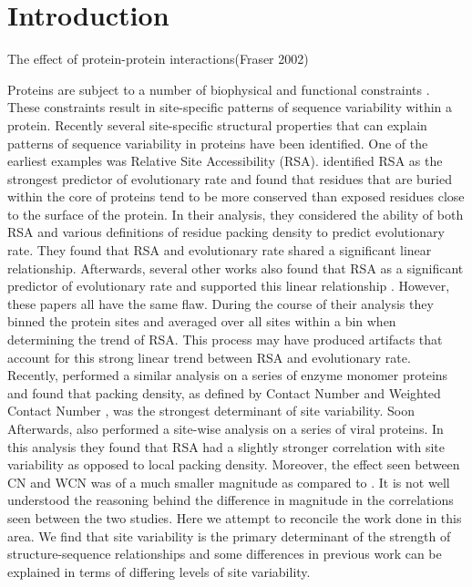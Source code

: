 \documentclass[12pt]{article}
\begin{document}
\section{Introduction}
\label{sec:intro}

The effect of protein-protein interactions(Fraser 2002)

Proteins are subject to a number of biophysical and functional constraints \citep{Scherreretal2012, Wilkeetal2010, Sikoseketal2014, Liberlesetal2009, Huangetal2014, Fraseretal2002, Liaoetal2010, Serohijosetal2012}. These constraints result in site-specific patterns of sequence variability within a protein. Recently several site-specific structural properties that can explain patterns of sequence variability in proteins have been identified. One of the earliest examples was Relative Site Accessibility (RSA). \cite{Fransozaetal2009} identified RSA as the strongest predictor of evolutionary rate and found that residues that are buried within the core of proteins tend to be more conserved than exposed residues close to the surface of the protein. In their analysis, they considered the ability of both RSA and various definitions of residue packing density to predict evolutionary rate. They found that RSA and evolutionary rate shared a significant linear relationship. Afterwards, several other works  also found that RSA as a significant predictor of evolutionary rate and supported this linear relationship \citep{Ramseyetal2011, Scherreretal2012}. However, these papers all have the same flaw. During the course of their analysis they binned the protein sites and averaged over all sites within a bin when determining the trend of RSA. This process may have produced artifacts that account for this strong linear trend between RSA and evolutionary rate. \\
\indent Recently, \cite{Yehetal2014a} performed a similar analysis on a series of enzyme monomer proteins and found that packing density, as defined by Contact Number and Weighted Contact Number \citep{Liaoetal2005, Yehetal2014a, Huangetal2014}, was the strongest determinant of site variability.  Soon Afterwards, \cite{Shahmoradietal2014} also performed a site-wise analysis on a series of viral proteins. In this analysis they found that RSA had a slightly stronger correlation with site variability as opposed to local packing density.  Moreover, the effect seen between CN and WCN was of a much smaller magnitude as compared to \cite{Yehetal2014a}. It is not well understood the reasoning behind the difference in magnitude in the correlations seen between the two studies. Here we attempt to reconcile the work done in this area. We find that site variability is the primary determinant of the strength of structure-sequence relationships and some differences in previous work can be explained in terms of differing levels of site variability. \\
\end{document}
